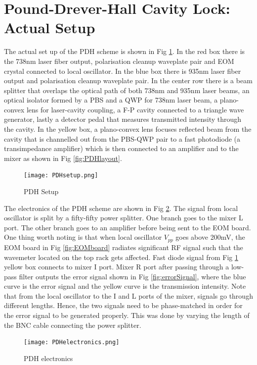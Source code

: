 \documentclass[12pt]{report}
\begin{document}
\section{Pound-Drever-Hall Cavity Lock: Actual Setup}
The actual set up of the PDH scheme is shown in Fig \ref{fig:PDHsetup}. In the red box there is the 738nm laser fiber output, polarisation cleanup waveplate pair and EOM crystal connected to local oscillator. In the blue box there is 935nm laser fiber output and polarisation cleanup waveplate pair. In the center row there is a beam splitter that overlaps the optical path of both 738nm and 935nm laser beams, an optical isolator formed by a PBS and a QWP for 738nm laser beam, a plano-convex lens for laser-cavity coupling, a F-P cavity connected to a triangle wave generator, lastly a detector pedal that measures transmitted intensity through the cavity. In the yellow box, a plano-convex lens focuses reflected beam from the cavity that is channelled out from the PBS-QWP pair to a fast photodiode (a transimpedance amplifier) which is then connected to an amplifier and to the mixer as shown in Fig \ref{fig:PDHlayout}. 

\begin{figure}[H]
    \centering
    \texttt{[image: PDHsetup.png]}
    \caption{PDH Setup}
    \label{fig:PDHsetup}
\end{figure}

The electronics of the PDH scheme are shown in Fig \ref{fig:PDHelectronics}. The signal from local oscillator is split by a fifty-fifty power splitter. One branch goes to the mixer L port. The other branch goes to an amplifier before being sent to the EOM board. One thing worth noting is that when local oscillator $V_{pp}$ goes above 200mV, the EOM board in Fig \ref{fig:EOMboard} radiates significant RF signal such that the wavemeter located on the top rack gets affected. Fast diode signal from Fig \ref{fig:PDHsetup} yellow box connects to mixer I port. Mixer R port after passing through a low-pass filter outputs the error signal shown in Fig \ref{fig:errorSignal}, where the blue curve is the error signal and the yellow curve is the transmission intensity.  Note that from the local oscillator to the I and L ports of the mixer, signals go through different lengths. Hence, the two signals need to be phase-matched in order for the error signal to be generated properly. This was done by varying the length of the BNC cable connecting the power splitter. 

\begin{figure}[H]
    \centering
    \texttt{[image: PDHelectronics.png]}
    \caption{PDH electronics}
    \label{fig:PDHelectronics}
\end{figure}
\end{document}
